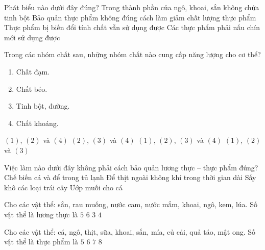 \documentclass[Main.tex]{subfiles}
\begin{document}
\begin{ex}%
	Phát biểu nào dưới đây đúng?
	\choice
	{Trong thành phần của ngô, khoai, sắn không chứa tinh bột}
	{\True Bảo quản thực phẩm không đúng cách làm giảm chất lượng thực phẩm}
	{Thực phẩm bị biến đổi tính chất vẫn sử dụng được}
	{Các thực phẩm phải nấu chín mới sử dụng được}
\end{ex}

\begin{ex}%
	Trong các nhóm chất sau, những nhóm chất nào cung cấp năng lượng cho cơ thể?
	\begin{enumerate}[(1)]
		\item Chất đạm.
		\item Chất béo.
		\item Tinh bột, đường.
		\item Chất khoáng.
	\end{enumerate}
	\choice
	{$(1)$, $(2)$ và $(4)$}
	{$(2)$, $(3)$ và $(4)$}
	{$(1)$, $(2)$, $(3)$ và $(4)$}
	{\True $(1)$, $(2)$ và $(3)$}
\end{ex}

\begin{ex}%
	Việc làm nào dưới đây không phải cách bảo quản lương thực -- thực phẩm đúng?
	\choice
	{Chế biến cá và để trong tủ lạnh}
	{\True Để thịt ngoài không khí trong thời gian dài}
	{Sấy khô các loại trái cây}
	{Ướp muối cho cá}
\end{ex}

\begin{ex}%
	Cho các vật thể: sắn, rau muống, nước cam, nước mắm, khoai, ngô, kem, lúa. Số vật thể là lương thực là
	\choice
	{$5$}
	{$6$}
	{$3$}
	{\True $4$}
\end{ex}

\begin{ex}%
	Cho các vật thể: cá, ngô, thịt, sữa, khoai, sắn, mía, củ cải, quả táo, mật ong. Số vật thể là thực phẩm là
	\choice
	{$5$}
	{$6$}
	{\True $7$}
	{$8$}
\end{ex}
\end{document}
